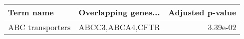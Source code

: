 \begin{tabular}{llr}
\toprule
       Term name & Overlapping genes... &  Adjusted p-value \\
\midrule
ABC transporters &     ABCC3,ABCA4,CFTR &          3.39e-02 \\
\bottomrule
\end{tabular}
